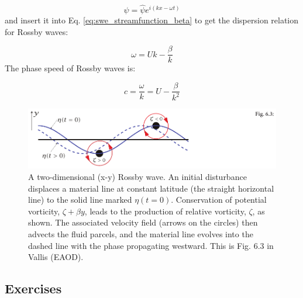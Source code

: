\documentclass[12pt]{article}
\numberwithin{equation}{section}
\numberwithin{figure}{section}
\numberwithin{table}{section}
\begin{document}
\begin{equation}
  \psi = \widehat{\psi} e^{i(kx - \omega t)}
\end{equation}
and insert it into Eq. \ref{eq:swe_streamfunction_beta} to get the dispersion
relation for Rossby waves:

\begin{equation}
  \omega = U k - \frac{\beta}{k}
  \label{eq:swe_rossby_wave_dispersion_1d}
\end{equation}
The phase speed of Rossby waves is:

\begin{equation}
  c = \frac{\omega}{k} = U - \frac{\beta}{k^2}
  \label{eq:swe_rossby_wave_phase_speed_1d}
\end{equation}

\begin{figure}[h]
  \centering
  \includegraphics[width=\textwidth]{assets/fig_rossby_wave.pdf}
  \caption{
    A two-dimensional (x-y) Rossby wave.
    An initial disturbance displaces a material line at constant latitude
    (the straight horizontal line) to the solid line marked $\eta(t=0)$.
    Conservation of potential vorticity, $\zeta + \beta y$, leads to the
    production of relative vorticity, $\zeta$, as shown.
    The associated velocity field (arrows on the circles) then advects the
    fluid parcels, and the material line evolves into the dashed line with
    the phase propagating westward.
    This is Fig. 6.3 in Vallis (EAOD).
  }
  \label{fig:swe_rossby_wave}
\end{figure}

\subsection*{Exercises}
\end{document}
